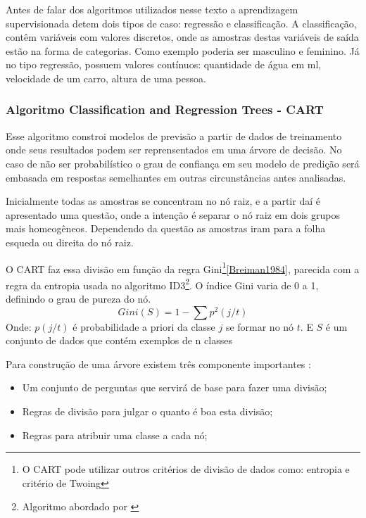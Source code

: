Antes de falar dos algoritmos utilizados nesse texto a aprendizagem supervisionada detem dois tipos de caso: regressão e classificação. A classificação, contêm variáveis com valores discretos, onde as amostras destas variáveis de saída estão na forma de categorias. Como exemplo poderia ser masculino e feminino. Já no tipo regressão, possuem valores contínuos: quantidade de água em ml, velocidade de um carro, altura de uma pessoa.


\subsubsection{Algoritmo Classification and Regression Trees  - CART}\label{cap:refTeor:sssec:cart}
Esse algoritmo constroi modelos de previsão a partir de dados de treinamento onde seus resultados podem ser reprensentados em uma árvore de decisão. No caso de não ser probabilístico o grau de confiança em seu modelo de predição será embasada em respostas semelhantes em outras circunstâncias antes analisadas. 

Inicialmente todas as amostras se concentram no nó raiz, e a partir daí é apresentado uma questão, onde a intenção é separar o nó raiz em dois grupos mais homeogêneos. Dependendo da questão as amostras iram para a folha esqueda ou direita do nó raiz.

O CART faz essa divisão em função da regra Gini\footnote{O CART pode utilizar outros critérios de divisão de dados como: entropia e critério de Twoing}\ref{Breiman1984}, parecida com a regra da entropia usada no algoritmo ID3\footnote{Algoritmo abordado por \cite{quinlans}}. O índice Gini varia de 0 a 1, definindo o grau de pureza do nó. 
\begin{equation}
Gini(S)= 1 - \sum p^2(j/t)
 \label{eq:cartGini}
\end{equation}
Onde: ${p(j/t)}$ é probabilidade a priori da classe ${j}$ se formar no nó ${t}$. E ${S}$ é um conjunto de dados que contém exemplos de n classes

Para construção de uma árvore existem três componente importantes \cite{yohannes1999classification}: 
\begin{itemize}
[noitemsep]
 \item Um conjunto de perguntas que servirá de base para fazer uma divisão;
 \item Regras de divisão para julgar o quanto é boa esta divisão;
 \item Regras para atribuir uma classe a cada nó;
\end{itemize}

